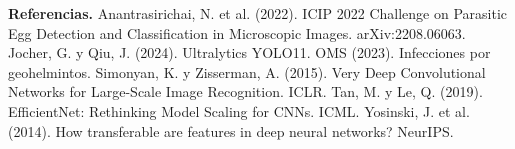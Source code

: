 \documentclass[10pt,letterpaper]{article}
\begin{document}
{\footnotesize
\textbf{Referencias.}
Anantrasirichai, N. et al. (2022). ICIP 2022 Challenge on Parasitic Egg Detection and Classification in Microscopic Images. arXiv:2208.06063.
Jocher, G. y Qiu, J. (2024). Ultralytics YOLO11.
OMS (2023). Infecciones por geohelmintos.
Simonyan, K. y Zisserman, A. (2015). Very Deep Convolutional Networks for Large-Scale Image Recognition. ICLR.
Tan, M. y Le, Q. (2019). EfficientNet: Rethinking Model Scaling for CNNs. ICML.
Yosinski, J. et al. (2014). How transferable are features in deep neural networks? NeurIPS.
\par}
\end{document}
